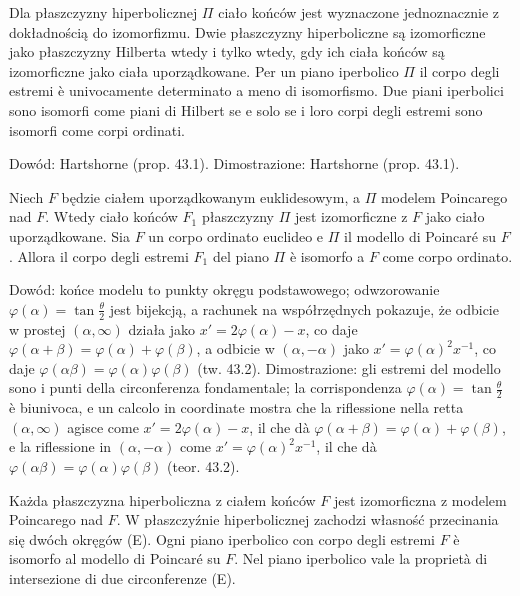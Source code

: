 \begin{proposition}
	Dla płaszczyzny hiperbolicznej $\Pi$ ciało końców jest wyznaczone jednoznacznie z dokładnością do izomorfizmu. %
	Dwie płaszczyzny hiperboliczne są izomorficzne jako płaszczyzny Hilberta wtedy i tylko wtedy, gdy ich ciała końców są izomorficzne jako ciała uporządkowane. %
	Per un piano iperbolico $\Pi$ il corpo degli estremi è univocamente determinato a meno di isomorfismo. %
	Due piani iperbolici sono isomorfi come piani di Hilbert se e solo se i loro corpi degli estremi sono isomorfi come corpi ordinati. %
\end{proposition}

Dowód: Hartshorne \cite[s. 416--418]{hartshorne_2000} (prop. 43.1). %
Dimostrazione: Hartshorne \cite[p. 416--418]{hartshorne_2000} (prop. 43.1). %

\begin{theorem}
	Niech $F$ będzie ciałem uporządkowanym euklidesowym, a $\Pi$ modelem Poincarego nad $F$. %
	Wtedy ciało końców $F_1$ płaszczyzny $\Pi$ jest izomorficzne z $F$ jako ciało uporządkowane. %
	Sia $F$ un corpo ordinato euclideo e $\Pi$ il modello di Poincaré su $F$. %
	Allora il corpo degli estremi $F_1$ del piano $\Pi$ è isomorfo a $F$ come corpo ordinato. %
\end{theorem}

Dowód: końce modelu to punkty okręgu podstawowego; odwzorowanie $\varphi(\alpha) = \tan\tfrac{\theta}{2}$ jest bijekcją, a rachunek na współrzędnych pokazuje, że odbicie w prostej $(\alpha, \infty)$ działa jako $x' = 2\varphi(\alpha) - x$, co daje $\varphi(\alpha+\beta) = \varphi(\alpha) + \varphi(\beta)$, a odbicie w $(\alpha, -\alpha)$ jako $x' = \varphi(\alpha)^2 x^{-1}$, co daje $\varphi(\alpha\beta) = \varphi(\alpha)\varphi(\beta)$ \cite[s. 418--422]{hartshorne_2000} (tw. 43.2). %
Dimostrazione: gli estremi del modello sono i punti della circonferenza fondamentale; la corrispondenza $\varphi(\alpha) = \tan\tfrac{\theta}{2}$ è biunivoca, e un calcolo in coordinate mostra che la riflessione nella retta $(\alpha, \infty)$ agisce come $x' = 2\varphi(\alpha) - x$, il che dà $\varphi(\alpha+\beta) = \varphi(\alpha) + \varphi(\beta)$, e la riflessione in $(\alpha, -\alpha)$ come $x' = \varphi(\alpha)^2 x^{-1}$, il che dà $\varphi(\alpha\beta) = \varphi(\alpha)\varphi(\beta)$ \cite[p. 418--422]{hartshorne_2000} (teor. 43.2). %

\begin{corollary}
	Każda płaszczyzna hiperboliczna z ciałem końców $F$ jest izomorficzna z modelem Poincarego nad $F$. %
	W płaszczyźnie hiperbolicznej zachodzi własność przecinania się dwóch okręgów (E). %
	Ogni piano iperbolico con corpo degli estremi $F$ è isomorfo al modello di Poincaré su $F$. %
	Nel piano iperbolico vale la proprietà di intersezione di due circonferenze (E). %
\end{corollary}

